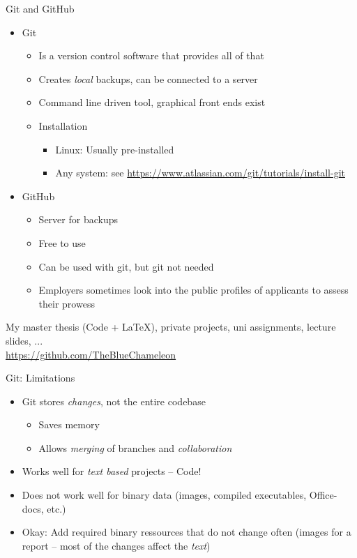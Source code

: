 \begin{frame}{Git and GitHub}
%
\vspace{-6pt}
\small
\begin{itemize}
\item Git
	\begin{itemize}
	\footnotesize
	\item Is a version control software that provides all of that
	\item Creates \emph{local} backups, can be connected to a server
	\item Command line driven tool, graphical front ends exist
	\item Installation
		\begin{itemize}
		\scriptsize
		\item Linux: Usually pre-installed
		\item Any system: see \url{https://www.atlassian.com/git/tutorials/install-git}
		\end{itemize}
	\end{itemize}
	\vspace{-6pt}
\item GitHub
	\begin{itemize}
	\footnotesize
	\item Server for backups
	\item Free to use
	\item Can be used with git, but git not needed
	\item Employers sometimes look into the public profiles of applicants to assess their prowess
	\end{itemize}
\end{itemize}
%
\vspace{-6pt}
\begin{hintbox}
\footnotesize
My master thesis (Code + \LaTeX), private projects, uni assignments, lecture slides, ...\\
\url{https://github.com/TheBlueChameleon}
\end{hintbox}
%
\end{frame}


\begin{frame}{Git: Limitations}
%
\begin{itemize}
\item Git stores \emph{changes}, not the entire codebase
	\begin{itemize}
	\item Saves memory
	\item Allows \emph{merging} of branches and \emph{collaboration}
	\end{itemize}
\item Works well for \emph{text based} projects -- Code!
\item Does not work well for binary data (images, compiled executables, Office-docs, etc.)
\item Okay: Add required binary ressources that do not change often (\eg images for a report -- most of the changes affect the \emph{text})
\end{itemize}
%
\end{frame}

